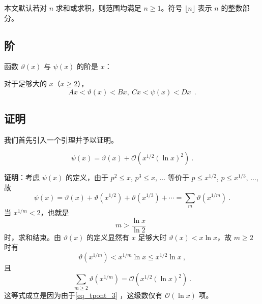 
本文默认若对 $n$ 求和或求积，则范围均满足 $n \ge 1$。符号 $\lfloor n \rfloor$ 表示 $n$ 的整数部分。
\subsection{阶}
\begin{theorem}{}
函数 $\vartheta(x)$ 与 $\psi(x)$ 的阶是 $x$：

对于足够大的 $x$（$x \ge 2$），
\begin{equation}
Ax < \vartheta(x) < Bx, ~ Cx < \psi(x) < Dx ~ ~.
\end{equation}

\end{theorem}

\subsection{证明}
我们首先引入一个引理并予以证明。
\begin{lemma}{}
\begin{equation}
\psi(x) = \vartheta(x) + \mathcal O\left( x^{1/2} (\ln x)^{2} \right) ~.
\end{equation}

\end{lemma}
\textbf{证明}：考虑 $\psi(x)$ 的定义，由于 $p^2 \le x$, $p^3 \le x$, $\dots$ 等价于 $p \le x^{1/2}$, $p \le x^{1/3}$, $\dots$, 故
\begin{equation}\label{eq_tpont_2}
\psi(x) = \vartheta(x) + \vartheta(x^{1/2}) + \vartheta(x^{1/3}) + \cdots = \sum_{m} \vartheta(x^{1/m}) ~.
\end{equation}
当 $x^{1/m} < 2$，也就是
\begin{equation}\label{eq_tpont_3}
m > \frac{\ln x}{\ln 2} ~~
\end{equation}
时，求和结束。由 $\vartheta(x)$ 的定义显然有 $x$ 足够大时 $\vartheta(x) < x \ln x$，故 $m \ge 2$ 时有
\begin{equation}
\vartheta(x^{1/m}) < x^{1/m} \ln x \le x^{1/2} \ln x~,
\end{equation}
且
\begin{equation}\label{eq_tpont_1}
\sum_{m \ge 2} \vartheta(x^{1/m}) = \mathcal O\left( x^{1/2} (\ln x)^{2} \right) ~.
\end{equation}
这等式成立是因为由于\autoref{eq_tpont_3} ，这级数仅有 $\mathcal O(\ln x)$ 项。

